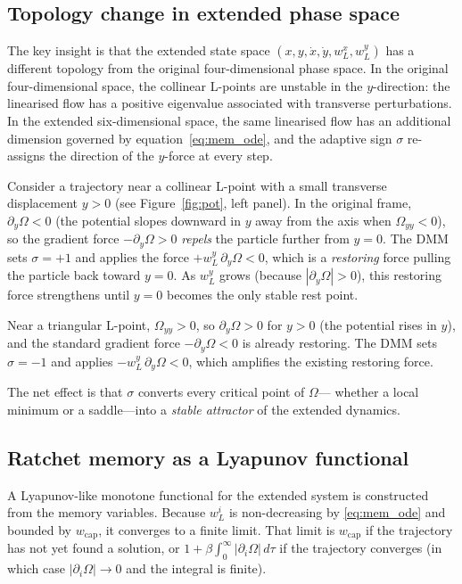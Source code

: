 \documentclass[10pt,twocolumn]{article}
\begin{document}
\subsection{Topology change in extended phase space}

The key insight is that the extended state space
$(x,y,\dot{x},\dot{y},w_L^x,w_L^y)$ has a different topology from the
original four-dimensional phase space.
In the original four-dimensional space, the collinear L-points are
unstable in the $y$-direction: the linearised flow has a positive eigenvalue
associated with transverse perturbations.
In the extended six-dimensional space, the same linearised flow has an
additional dimension governed by equation~\eqref{eq:mem_ode}, and the
adaptive sign $\sigma$ re-assigns the direction of the $y$-force at every step.

Consider a trajectory near a collinear L-point with a small transverse
displacement $y>0$ (see Figure~\ref{fig:pot}, left panel).
In the original frame, $\partial_y\Omega<0$ (the potential slopes downward in
$y$ away from the axis when $\Omega_{yy}<0$), so the gradient force
$-\partial_y\Omega>0$ \emph{repels} the particle further from $y=0$.
The DMM sets $\sigma=+1$ and applies the force $+w_L^y\,\partial_y\Omega<0$,
which is a \emph{restoring} force pulling the particle back toward $y=0$.
As $w_L^y$ grows (because $|\partial_y\Omega|>0$), this restoring force
strengthens until $y=0$ becomes the only stable rest point.

Near a triangular L-point, $\Omega_{yy}>0$, so $\partial_y\Omega>0$ for
$y>0$ (the potential rises in $y$), and the standard gradient force
$-\partial_y\Omega<0$ is already restoring.
The DMM sets $\sigma=-1$ and applies $-w_L^y\,\partial_y\Omega<0$, which
amplifies the existing restoring force.

The net effect is that $\sigma$ converts every critical point of $\Omega$---
whether a local minimum or a saddle---into a \emph{stable attractor} of the
extended dynamics.

\subsection{Ratchet memory as a Lyapunov functional}

A Lyapunov-like monotone functional for the extended system is constructed from
the memory variables.
Because $w_L^i$ is non-decreasing by \eqref{eq:mem_ode} and bounded by
$w_{\text{cap}}$, it converges to a finite limit.
That limit is $w_{\text{cap}}$ if the trajectory has not yet found a solution,
or $1+\beta\int_0^\infty|\partial_i\Omega|\,d\tau$ if the trajectory
converges (in which case $|\partial_i\Omega|\to0$ and the integral is finite).
\end{document}
